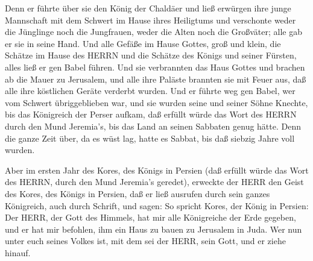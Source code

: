  Denn er führte über sie den König der Chaldäer und ließ
erwürgen ihre junge Mannschaft mit dem Schwert im Hause ihres Heiligtums
und verschonte weder die Jünglinge noch die Jungfrauen, weder die Alten
noch die Großväter; alle gab er sie in seine Hand.  Und
alle Gefäße im Hause Gottes, groß und klein, die Schätze im Hause des
HERRN und die Schätze des Königs und seiner Fürsten, alles ließ er gen
Babel führen.  Und sie verbrannten das Haus Gottes und
brachen ab die Mauer zu Jerusalem, und alle ihre Paläste brannten sie
mit Feuer aus, daß alle ihre köstlichen Geräte verderbt wurden.
 Und er führte weg gen Babel, wer vom Schwert
übriggeblieben war, und sie wurden seine und seiner Söhne Knechte, bis
das Königreich der Perser aufkam,  daß erfüllt würde das
Wort des HERRN durch den Mund Jeremia's, bis das Land an seinen Sabbaten
genug hätte. Denn die ganze Zeit über, da es wüst lag, hatte es Sabbat,
bis daß siebzig Jahre voll wurden.

 Aber im ersten Jahr des Kores, des Königs in Persien (daß
erfüllt würde das Wort des HERRN, durch den Mund Jeremia's geredet),
erweckte der HERR den Geist des Kores, des Königs in Persien, daß er
ließ ausrufen durch sein ganzes Königreich, auch durch Schrift, und
sagen:  So spricht Kores, der König in Persien: Der HERR,
der Gott des Himmels, hat mir alle Königreiche der Erde gegeben, und er
hat mir befohlen, ihm ein Haus zu bauen zu Jerusalem in Juda. Wer nun
unter euch seines Volkes ist, mit dem sei der HERR, sein Gott, und er
ziehe hinauf.
